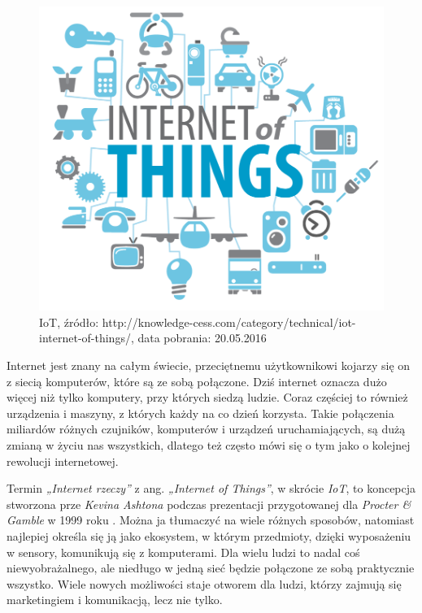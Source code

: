 \documentclass[brudnopis]{xmgr}
\begin{document}
\maketitle
\introduction

 
\begin{figure}[h]
\centering
\includegraphics[width=\textwidth]{iot_wstep}
\caption{IoT, źródło: http://knowledge-cess.com/category/technical/iot-internet-of-things/, data pobrania: 20.05.2016}
\label{fig:iot}
\end{figure}

Internet jest znany na całym świecie, przeciętnemu użytkownikowi kojarzy się on z siecią komputerów, które są ze sobą połączone. Dziś internet oznacza dużo więcej niż tylko komputery, przy których siedzą ludzie. Coraz częściej to również urządzenia i maszyny, z których każdy na co dzień korzysta. Takie połączenia miliardów różnych czujników, komputerów i urządzeń uruchamiających, są dużą zmianą w życiu nas wszystkich, dlatego też często mówi się o tym jako o kolejnej rewolucji internetowej.

Termin \emph{„Internet rzeczy”} z ang. \emph{„Internet of Things”}, w skrócie \emph{IoT}, to koncepcja stworzona prze \emph{Kevina Ashtona} podczas prezentacji przygotowanej dla \emph{Procter \& Gamble} w 1999 roku \cite{KA:2009:iot}. Można ja tłumaczyć na wiele różnych sposobów, natomiast najlepiej określa się ją jako ekosystem, w którym przedmioty, dzięki wyposażeniu w sensory, komunikują się z komputerami. Dla wielu ludzi to nadal coś niewyobrażalnego, ale niedługo w jedną sieć będzie połączone ze sobą praktycznie wszystko. Wiele nowych możliwości staje otworem dla ludzi, którzy zajmują się marketingiem i komunikacją, lecz nie tylko. 
\end{document}

